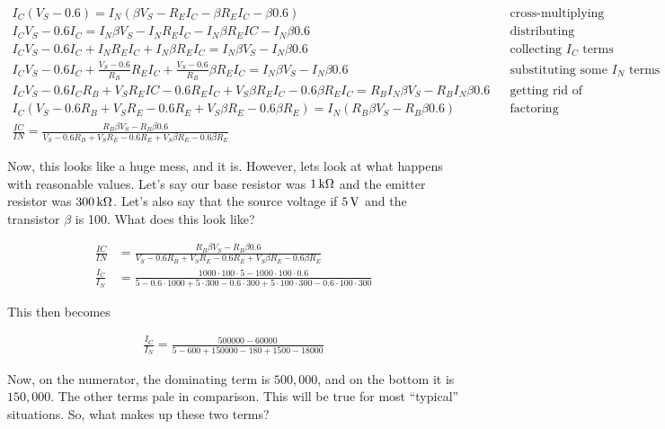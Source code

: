 \begin{align*}
I_C(V_S - 0.6) = I_N(\beta V_S - R_E I_C - \beta R_E I_C - \beta 0.6) && \textrm{cross-multiplying} \\
I_C V_S - 0.6 I_C = I_N \beta V_S - I_N R_E I_C - I_N \beta R_E IC - I_N \beta 0.6 && \textrm{distributing} \\
I_C V_S - 0.6 I_C + I_N R_E I_C + I_N \beta R_E I_C =  I_N \beta V_S  -  I_N \beta 0.6 && \textrm{collecting $I_C$ terms} \\
I_C V_S - 0.6 I_C + \frac{V_S - 0.6}{R_B} R_E I_C + \frac{V_S - 0.6}{R_B} \beta R_E I_C =  I_N \beta V_S  -  I_N \beta 0.6 && \textrm{substituting some $I_N$ terms} \\
I_C V_S - 0.6 I_C R_B + V_S R_E IC - 0.6 R_E I_C + V_S \beta R_E I_C - 0.6 \beta R_E I_C =  R_B I_N \beta V_S  -  R_B I_N \beta 0.6 && \textrm{getting rid of fraction} \\
I_C(V_S - 0.6 R_B + V_S R_E - 0.6 R_E + V_S \beta R_E - 0.6 \beta R_E) =  I_N(R_B \beta V_S  -  R_B \beta 0.6) && \textrm{factoring} \\
\frac{IC}{IN} = \frac{R_B \beta V_S  -  R_B \beta 0.6}{V_S - 0.6 R_B + V_S R_E - 0.6 R_E + V_S \beta R_E - 0.6 \beta R_E}
\end{align*}

Now, this looks like a huge mess, and it is.
However, lets look at what happens with reasonable values.
Let's say our base resistor was $1\,\si{\kilo\ohm}$ and the emitter resistor was $300\,\si{\kilo\ohm}$.  
Let's also say that the source voltage if $5\,\si{\volt}$ and the transistor $\beta$ is 100.
What does this look like?

\begin{align*}
\frac{IC}{IN} &= \frac{R_B \beta V_S  -  R_B \beta 0.6}{V_S - 0.6 R_B + V_S R_E - 0.6 R_E + V_S \beta R_E - 0.6 \beta R_E} \\
\frac{I_C}{I_N} &= \frac{1000 \cdot 100 \cdot 5  -  1000\cdot 100 \cdot 0.6}{5 - 0.6 \cdot 1000 + 5 \cdot 300 - 0.6 \cdot 300 + 5\cdot 100 \cdot 300 - 0.6 \cdot 100 \cdot 300}
\end{align*}

This then becomes

\begin{align*}
\frac{I_C}{I_N} = \frac{500000 - 60000}{5 - 600 + 150000 - 180 + 1500 - 18000}
\end{align*}

Now, on the numerator, the dominating term is $500,000$, and on the bottom it is $150,000$.  
The other terms pale in comparison.
This will be true for most ``typical'' situations.
So, what makes up these two terms?

